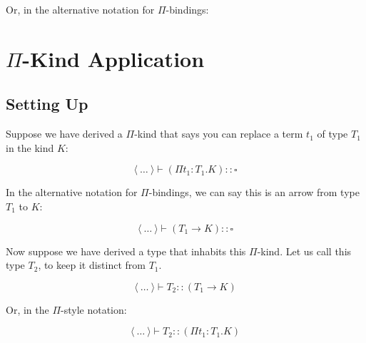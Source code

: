 \documentclass{book}
\numberwithin{equation}{chapter}
\begin{document}
\noindent
Or, in the alternative notation for $\Pi$-bindings:

\begin{prooftree}
\end{prooftree}



\chapter{$\Pi$-Kind Application}


\section{Setting Up}

Suppose we have derived a $\Pi$-kind that says you can replace a term $t_{1}$ of type $T_{1}$ in the kind $K$:

\begin{equation}
\langle~\ldots~\rangle \vdash (\Pi t_{1} : T_{1}.K) :: \square
\end{equation}

\noindent
In the alternative notation for $\Pi$-bindings, we can say this is an arrow from type $T_{1}$ to $K$:

\begin{equation}
\langle~\ldots~\rangle \vdash (T_{1} \rightarrow K) :: \square
\end{equation}

\noindent
Now suppose we have derived a type that inhabits this $\Pi$-kind. Let us call this type $T_{2}$, to keep it distinct from $T_{1}$.

\begin{equation}
\langle~\ldots~\rangle \vdash T_{2} :: (T_{1} \rightarrow K)
\end{equation}

\noindent
Or, in the $\Pi$-style notation:

\begin{equation}
\langle~\ldots~\rangle \vdash T_{2} :: (\Pi t_{1} : T_{1}.K)
\end{equation}
\end{document}
